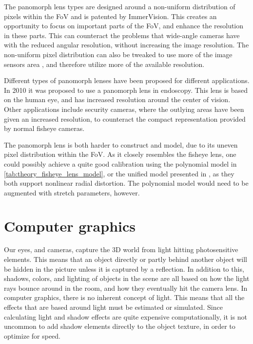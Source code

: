 The panomorph lens types are designed around a non-uniform distribution of pixels within the FoV and is patented by ImmerVision. This creates an opportunity to focus on important parts of the FoV, and enhance the resolution in these parts. This can counteract the problems that wide-angle cameras have with the reduced angular resolution, without increasing the image resolution. The non-uniform pixel distribution can also be tweaked to use more of the image sensors area \cite{PanomorphLowCostSurvailance}, and therefore utilize more of the available resolution.

Different types of panomorph lenses have been proposed for different applications. In 2010 it was proposed to use a panomorph lens in endoscopy\cite{endoscopypano}. This lens is based on the human eye, and has increased resolution around the center of vision. Other applications include security cameras\cite{PanomorphEnhancesSurvailance}, where the outlying areas have been given an increased resolution, to counteract the compact representation provided by normal fisheye cameras.

The panomorph lens is both harder to construct and model, due to its uneven pixel distribution within the FoV. As it closely resembles the fisheye lens, one could possibly achieve a quite good calibration using the polynomial model in \ref{tab:theory_fisheye_lens_model}, or the unified model presented in \cite{FisheyeKalibration}, as they both support nonlinear radial distortion. The polynomial model would need to be augmented with stretch parameters, however.

\section{Computer graphics}

Our eyes, and cameras, capture the 3D world from light hitting photosensitive elements. This means that an object directly or partly behind another object will be hidden in the picture unless it is captured by a reflection. In addition to this, shadows, colors, and lighting of objects in the scene are all based on how the light rays bounce around in the room, and how they eventually hit the camera lens. In computer graphics, there is no inherent concept of light. This means that all the effects that are based around light must be estimated or simulated. Since calculating light and shadow effects are quite expensive computationally, it is not uncommon to add shadow elements directly to the object texture, in order to optimize for speed.


